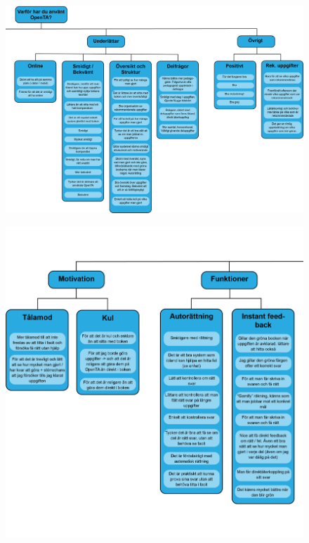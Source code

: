 
\begin{figure}[hbtp]
    \centering
    \includegraphics[scale=0.50,angle=90]{appendix/appendix_blue/nr1_part2.png}
    \caption*{}
    \label{fig:nr1_part2}
\end{figure}

\begin{figure}[hbtp]
    \centering
    \includegraphics[scale=0.5,angle=90]{appendix/appendix_blue/nr1_part1.png}
    \caption*{}
    \label{fig:nr1_part1}
\end{figure}

